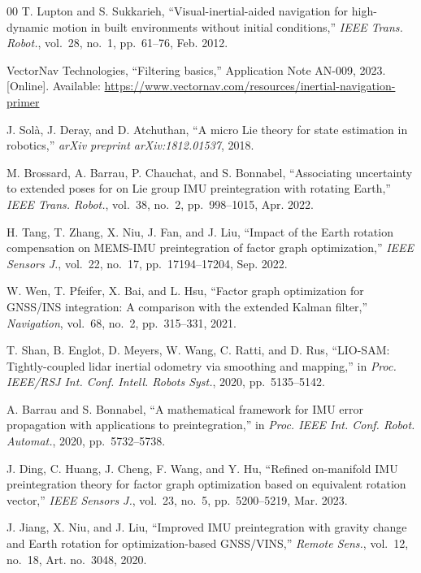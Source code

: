 \documentclass[journal]{IEEEtran}
\begin{document}
\begin{thebibliography}{00}
		T. Lupton and S. Sukkarieh, ``Visual-inertial-aided navigation for high-dynamic motion in built environments without initial conditions,'' \textit{IEEE Trans. Robot.}, vol.~28, no.~1, pp.~61--76, Feb. 2012.
        
		VectorNav Technologies, ``Filtering basics,'' Application Note AN-009, 2023. [Online]. Available: \url{https://www.vectornav.com/resources/inertial-navigation-primer}
        
		J. Sol\`a, J. Deray, and D. Atchuthan, ``A micro Lie theory for state estimation in robotics,'' \textit{arXiv preprint arXiv:1812.01537}, 2018.
        
		M. Brossard, A. Barrau, P. Chauchat, and S. Bonnabel, ``Associating uncertainty to extended poses for on Lie group IMU preintegration with rotating Earth,'' \textit{IEEE Trans. Robot.}, vol.~38, no.~2, pp.~998--1015, Apr. 2022.
        
		H. Tang, T. Zhang, X. Niu, J. Fan, and J. Liu, ``Impact of the Earth rotation compensation on MEMS-IMU preintegration of factor graph optimization,'' \textit{IEEE Sensors J.}, vol.~22, no.~17, pp.~17194--17204, Sep. 2022.
        
		W. Wen, T. Pfeifer, X. Bai, and L. Hsu, ``Factor graph optimization for GNSS/INS integration: A comparison with the extended Kalman filter,'' \textit{Navigation}, vol.~68, no.~2, pp.~315--331, 2021.
        
		T. Shan, B. Englot, D. Meyers, W. Wang, C. Ratti, and D. Rus, ``LIO-SAM: Tightly-coupled lidar inertial odometry via smoothing and mapping,'' in \textit{Proc. IEEE/RSJ Int. Conf. Intell. Robots Syst.}, 2020, pp.~5135--5142.
        
		A. Barrau and S. Bonnabel, ``A mathematical framework for IMU error propagation with applications to preintegration,'' in \textit{Proc. IEEE Int. Conf. Robot. Automat.}, 2020, pp.~5732--5738.
        
		J. Ding, C. Huang, J. Cheng, F. Wang, and Y. Hu, ``Refined on-manifold IMU preintegration theory for factor graph optimization based on equivalent rotation vector,'' \textit{IEEE Sensors J.}, vol.~23, no.~5, pp.~5200--5219, Mar. 2023.
        
		J. Jiang, X. Niu, and J. Liu, ``Improved IMU preintegration with gravity change and Earth rotation for optimization-based GNSS/VINS,'' \textit{Remote Sens.}, vol.~12, no.~18, Art. no.~3048, 2020.
        
	\end{thebibliography}
\end{document}
